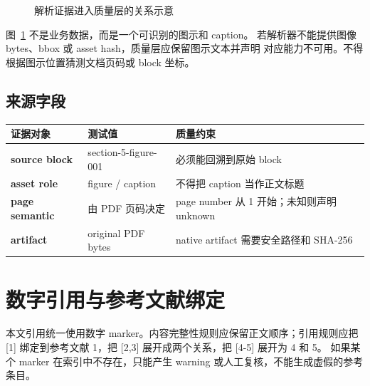 \documentclass[UTF8,a4paper,11pt]{ctexart}
\begin{document}
\begin{figure}[htbp]
\centering
{}
\caption{解析证据进入质量层的关系示意}
\label{fig:evidence-flow}
\end{figure}

图~\ref{fig:evidence-flow} 不是业务数据，而是一个可识别的图示和 caption。
若解析器不能提供图像 bytes、bbox 或 asset hash，质量层应保留图示文本并声明
对应能力不可用。不得根据图示位置猜测文档页码或 block 坐标。

\subsection{来源字段}

\begin{tabularx}{\textwidth}{>{\bfseries}p{} Y Y}
\toprule
证据对象 & 测试值 & 质量约束 \\
\midrule
source block & section-5-figure-001 & 必须能回溯到原始 block \\
asset role & figure / caption & 不得把 caption 当作正文标题 \\
page semantic & 由 PDF 页码决定 & page number 从 1 开始；未知则声明 unknown \\
artifact & original PDF bytes & native artifact 需要安全路径和 SHA-256 \\
\bottomrule
\end{tabularx}

\section{数字引用与参考文献绑定}

本文引用统一使用数字 marker。内容完整性规则应保留正文顺序；引用规则应把
[1] 绑定到参考文献 1，把 [2,3] 展开成两个关系，把 [4-5] 展开为 4 和 5。
如果某个 marker 在索引中不存在，只能产生 warning 或人工复核，不能生成虚假的参考条目。
\end{document}
